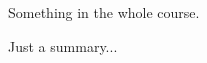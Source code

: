 \documentclass[10pt]{article}
\begin{document}
Something in the whole course.

\begin{forshort}
    Just a summary...
\end{forshort}
\end{document}
